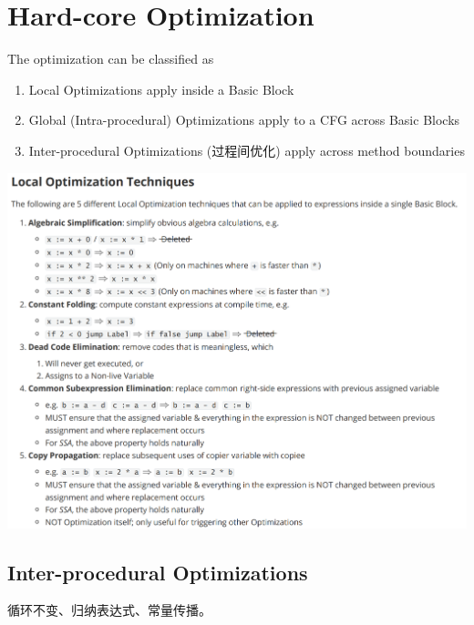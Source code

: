 \documentclass[a4paper]{article}
\theoremstyle{definition}
\begin{document}
\section{Hard-core Optimization}
The optimization can be classified as 
\begin{enumerate}
  \item Local Optimizations apply inside a Basic Block
  \item Global (Intra-procedural) Optimizations apply to a CFG across Basic Blocks
  \item Inter-procedural Optimizations (过程间优化) apply across method boundaries
\end{enumerate}
\includegraphics[width=16cm]{img/Snipaste_2021-05-31_17-49-19.png}
\subsection{Inter-procedural Optimizations}
循环不变、归纳表达式、常量传播。
\end{document}
